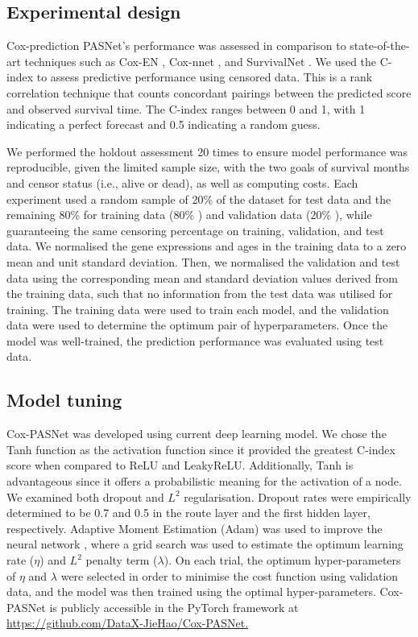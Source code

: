 \documentclass[10pt,twocolumn,twoside,lineno]{gsajnl}
\begin{document}
\subsection{Experimental design}

Cox-prediction PASNet's performance was assessed in comparison to state-of-the-art techniques such as Cox-EN \citep{JSSv039i05}, Cox-nnet \citep{Ching2018}, and SurvivalNet \citep{Yousefi2017}. We used the C-index to assess predictive performance using censored data. This is a rank correlation technique that counts concordant pairings between the predicted score and observed survival time. The C-index ranges between 0 and 1, with 1 indicating a perfect forecast and 0.5 indicating a random guess.


We performed the holdout assessment 20 times to ensure model performance was reproducible, given the limited sample size, with the two goals of survival months and censor status (i.e., alive or dead), as well as computing costs. Each experiment used a random sample of 20\% of the dataset for test data and the remaining 80\% for training data (80\% ) and validation data (20\% ), while guaranteeing the same censoring percentage on training, validation, and test data. We normalised the gene expressions and ages in the training data to a zero mean and unit standard deviation. Then, we normalised the validation and test data using the corresponding mean and standard deviation values derived from the training data, such that no information from the test data was utilised for training. The training data were used to train each model, and the validation data were used to determine the optimum pair of hyperparameters. Once the model was well-trained, the prediction performance was evaluated using test data.

\subsection{Model tuning}

Cox-PASNet was developed using current deep learning model. We chose the Tanh function as the activation function since it provided the greatest C-index score when compared to ReLU and LeakyReLU. Additionally, Tanh is advantageous since it offers a probabilistic meaning for the activation of a node. We examined both dropout and $ L^{2} $ regularisation. Dropout rates were empirically determined to be 0.7 and 0.5 in the route layer and the first hidden layer, respectively. Adaptive Moment Estimation (Adam) was used to improve the neural network \citep{kingma2017adam}, where a grid search was used to estimate the optimum learning rate ($ \eta $) and $ L^{2} $ penalty term ($ \lambda $). On each trial, the optimum hyper-parameters of $ \eta $ and $ \lambda $ were selected in order to minimise the cost function using validation data, and the model was then trained using the optimal hyper-parameters. Cox-PASNet is publicly accessible in the PyTorch framework at \url{https://github.com/DataX-JieHao/Cox-PASNet.}
\end{document}
